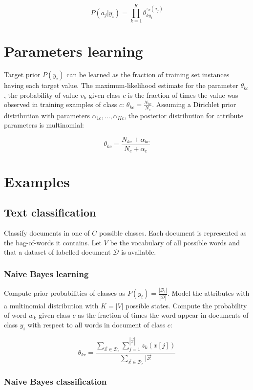 	$$P(a_j|y_i) = \prod\limits_{k=1}^K\theta_{ky_i}^{z_k(a_j)}$$

\section{Parameters learning}
Target prior $P(y_i)$ can be learned as the fraction of training set instances having each target value.
The maximum-likelihood estimate for the parameter $\theta_{kc}$, the probability of value $v_k$ given class $c$ is the fraction of times the value was observed in training examples of class $c$: $\theta_{kc} = \frac{N_{kc}}{N_c}$.
Assuming a Dirichlet prior distribution with parameters $\alpha_{1c},\dots,\alpha_{Kc}$, the posterior distribution for attribute parameters is multinomial:

$$\theta_{kc} = \frac{N_{kc}+\alpha_{kc}}{N_c+\alpha_c}$$

\section{Examples}

	\subsection{Text classification}
	Classify documents in one of $C$ possible classes.
	Each document is represented as the bag-of-words it contains.
	Let $V$ be the vocabulary of all possible words and that a dataset of labelled document $\mathcal{D}$ is available.

		\subsubsection{Naive Bayes learning}
		Compute prior probabilities of classes as $P(y_i) = \frac{|\mathcal{D}_i|}{|\mathcal{D}|}$.
		Model the attributes with a multinomial distribution with $K=|V|$ possible states.
		Compute the probability of word $w_k$ given class $c$ as the fraction of times the word appear in documents of class $y_i$ with respect to all words in document of class $c$:

		$$\theta_{kc} = \frac{\sum\limits_{\vec{x}\in\mathcal{D}_c}\sum\limits_{j=1}^{|\vec{x}|}z_k(x[j])}{\sum\limits_{\vec{x}\in\mathcal{D}_c}|\vec{x}}$$

		\subsubsection{Naive Bayes classification}

